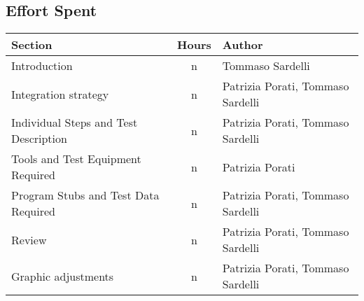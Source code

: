 \subsection{Effort Spent}

\begin{center}
	\vspace{0.2cm}
	\begin{tabular}{ l c l } 
		\hline
		Section 					& Hours & Author \\ 
		\hline
		Introduction								& n 	& Tommaso Sardelli	\\
		Integration strategy						& n 	& Patrizia Porati, Tommaso Sardelli	\\
		Individual Steps and Test Description 		& n 	& Patrizia Porati, Tommaso Sardelli \\ 
		Tools and Test Equipment Required 			& n	 	& Patrizia Porati	\\
		Program Stubs and Test Data Required		& n		& Patrizia Porati, Tommaso Sardelli	\\
		Review										& n		& Patrizia Porati, Tommaso Sardelli	\\
		Graphic adjustments     				    & n		& Patrizia Porati, Tommaso Sardelli	\\
		\hline
	\end{tabular}
\end{center}

